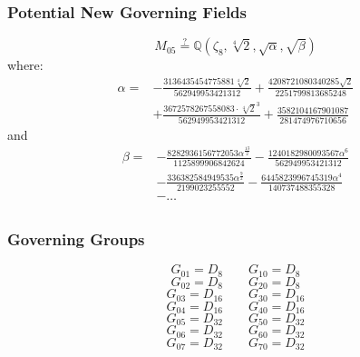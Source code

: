 \documentclass[12pt]{beamer}
\begin{document}
	\begin{frame}
	\frametitle{Potential New Governing Fields}
		$$M_{05} \stackrel{?}{=}\mathbb{Q}\left(\zeta_8, \sqrt[4]{2}, \sqrt{\alpha}, \sqrt{\beta}\right)$$
		where:
		\begin{align*}
			\alpha =
			&- \frac{3136435454775881 \sqrt[4]{2}}{562949953421312} + \frac{4208721080340285 \sqrt{2}}{2251799813685248} \\
			&+ \frac{3672578267558083 \cdot \sqrt[4]{2}^3}{562949953421312} + \frac{3582104167901087}{281474976710656}
		\end{align*}
		and
		\begin{align*}
		\beta = 
		&- \frac{8282936156772053 \alpha^{\frac{13}{2}}}{1125899906842624} 
		- \frac{1240182980093567 \alpha^{6}}{562949953421312} \\
		&- \frac{336382584949535 \alpha^{\frac{9}{2}}}{2199023255552} 
		- \frac{6445823996745319 \alpha^{4}}{140737488355328} \\
		&-\dots \\
		\end{align*}
	\end{frame}
	
	\begin{frame}
		\frametitle{Governing Groups}
		$$G_{01} = D_{8} \qquad G_{10} = D_{8}$$
		$$G_{02} = D_{8} \qquad G_{20} = D_{8}$$
		$$G_{03} = D_{16} \qquad G_{30} = D_{16}$$
		$$G_{04} = D_{16} \qquad G_{40} = D_{16}$$
		$$G_{05} = D_{32} \qquad G_{50} = D_{32}$$
		$$G_{06} = D_{32} \qquad G_{60} = D_{32}$$
		$$G_{07} = D_{32} \qquad G_{70} = D_{32}$$
	\end{frame}
\end{document}
